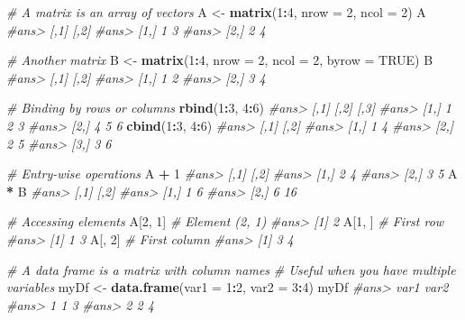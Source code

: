\documentclass[]{book}
\newenvironment{Shaded}{\begin{snugshade}}{\end{snugshade}}
\newcommand{\KeywordTok}[1]{\textcolor[rgb]{0.13,0.29,0.53}{\textbf{#1}}}
\newcommand{\DataTypeTok}[1]{\textcolor[rgb]{0.13,0.29,0.53}{#1}}
\newcommand{\DecValTok}[1]{\textcolor[rgb]{0.00,0.00,0.81}{#1}}
\newcommand{\StringTok}[1]{\textcolor[rgb]{0.31,0.60,0.02}{#1}}
\newcommand{\CommentTok}[1]{\textcolor[rgb]{0.56,0.35,0.01}{\textit{#1}}}
\newcommand{\OtherTok}[1]{\textcolor[rgb]{0.56,0.35,0.01}{#1}}
\newcommand{\OperatorTok}[1]{\textcolor[rgb]{0.81,0.36,0.00}{\textbf{#1}}}
\newcommand{\NormalTok}[1]{#1}
\begin{document}
\begin{Shaded}
\begin{Highlighting}[]
\CommentTok{# A matrix is an array of vectors}
\NormalTok{A <-}\StringTok{ }\KeywordTok{matrix}\NormalTok{(}\DecValTok{1}\OperatorTok{:}\DecValTok{4}\NormalTok{, }\DataTypeTok{nrow =} \DecValTok{2}\NormalTok{, }\DataTypeTok{ncol =} \DecValTok{2}\NormalTok{)}
\NormalTok{A}
\CommentTok{#ans>      [,1] [,2]}
\CommentTok{#ans> [1,]    1    3}
\CommentTok{#ans> [2,]    2    4}

\CommentTok{# Another matrix}
\NormalTok{B <-}\StringTok{ }\KeywordTok{matrix}\NormalTok{(}\DecValTok{1}\OperatorTok{:}\DecValTok{4}\NormalTok{, }\DataTypeTok{nrow =} \DecValTok{2}\NormalTok{, }\DataTypeTok{ncol =} \DecValTok{2}\NormalTok{, }\DataTypeTok{byrow =} \OtherTok{TRUE}\NormalTok{)}
\NormalTok{B}
\CommentTok{#ans>      [,1] [,2]}
\CommentTok{#ans> [1,]    1    2}
\CommentTok{#ans> [2,]    3    4}

\CommentTok{# Binding by rows or columns}
\KeywordTok{rbind}\NormalTok{(}\DecValTok{1}\OperatorTok{:}\DecValTok{3}\NormalTok{, }\DecValTok{4}\OperatorTok{:}\DecValTok{6}\NormalTok{)}
\CommentTok{#ans>      [,1] [,2] [,3]}
\CommentTok{#ans> [1,]    1    2    3}
\CommentTok{#ans> [2,]    4    5    6}
\KeywordTok{cbind}\NormalTok{(}\DecValTok{1}\OperatorTok{:}\DecValTok{3}\NormalTok{, }\DecValTok{4}\OperatorTok{:}\DecValTok{6}\NormalTok{)}
\CommentTok{#ans>      [,1] [,2]}
\CommentTok{#ans> [1,]    1    4}
\CommentTok{#ans> [2,]    2    5}
\CommentTok{#ans> [3,]    3    6}

\CommentTok{# Entry-wise operations}
\NormalTok{A }\OperatorTok{+}\StringTok{ }\DecValTok{1}
\CommentTok{#ans>      [,1] [,2]}
\CommentTok{#ans> [1,]    2    4}
\CommentTok{#ans> [2,]    3    5}
\NormalTok{A }\OperatorTok{*}\StringTok{ }\NormalTok{B}
\CommentTok{#ans>      [,1] [,2]}
\CommentTok{#ans> [1,]    1    6}
\CommentTok{#ans> [2,]    6   16}

\CommentTok{# Accessing elements}
\NormalTok{A[}\DecValTok{2}\NormalTok{, }\DecValTok{1}\NormalTok{] }\CommentTok{# Element (2, 1)}
\CommentTok{#ans> [1] 2}
\NormalTok{A[}\DecValTok{1}\NormalTok{, ] }\CommentTok{# First row}
\CommentTok{#ans> [1] 1 3}
\NormalTok{A[, }\DecValTok{2}\NormalTok{] }\CommentTok{# First column}
\CommentTok{#ans> [1] 3 4}

\CommentTok{# A data frame is a matrix with column names}
\CommentTok{# Useful when you have multiple variables}
\NormalTok{myDf <-}\StringTok{ }\KeywordTok{data.frame}\NormalTok{(}\DataTypeTok{var1 =} \DecValTok{1}\OperatorTok{:}\DecValTok{2}\NormalTok{, }\DataTypeTok{var2 =} \DecValTok{3}\OperatorTok{:}\DecValTok{4}\NormalTok{)}
\NormalTok{myDf}
\CommentTok{#ans>   var1 var2}
\CommentTok{#ans> 1    1    3}
\CommentTok{#ans> 2    2    4}


\end{Highlighting}
\end{Shaded}
\end{document}
